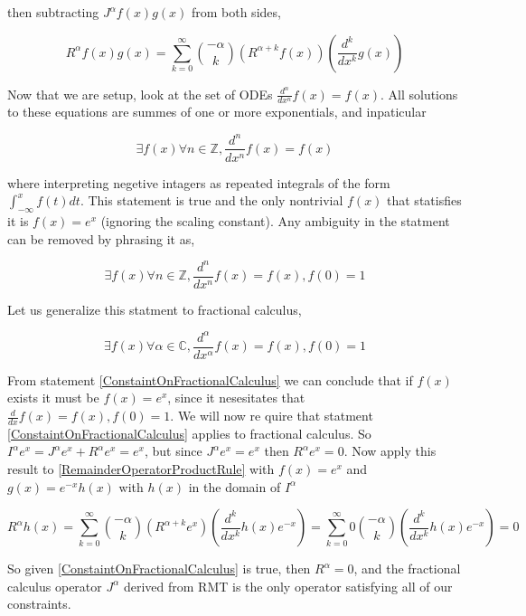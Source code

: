 \documentclass[%
 preprint,
 amsmath, amssymb, aps, pra, 10pt
]{revtex4-2}
\begin{document}
then subtracting $J^\alpha f(x)g(x)$ from both sides, 

\begin{equation}
R^\alpha f(x)g(x) = \sum_{k=0}^\infty \binom{-\alpha}{k}\left( R^{\alpha + k}f(x) \right)\left( \frac{d^k}{dx^k} g(x)\right)
\label{RemainderOperatorProductRule}
\end{equation}

Now that we are setup, look at the set of ODEs $\frac{d^n}{dx^n}f(x) = f(x)$. All solutions to these equations are summes of one or more exponentials, and inpaticular

\[\exists f(x) \forall n \in \mathbb{Z}, \frac{d^n}{dx^n}f(x) = f(x)\]

where interpreting negetive intagers as repeated integrals of the form $\int_{-\infty}^x f(t)dt$. This statement is true and the only nontrivial $f(x)$ that statisfies it is $f(x) = e^x$ (ignoring the scaling constant). Any ambiguity in the statment can be removed by phrasing it as,

\begin{equation}
\exists f(x) \forall n \in \mathbb{Z}, \frac{d^n}{dx^n}f(x) = f(x), f(0) = 1
\label{ConstaintOnCalculus}
\end{equation}

Let us generalize this statment to fractional calculus,

\begin{equation}
\exists f(x) \forall \alpha \in \mathbb{C}, \frac{d^\alpha}{dx^\alpha}f(x) = f(x), f(0) = 1
\label{ConstaintOnFractionalCalculus}
\end{equation}

From statement \eqref{ConstaintOnFractionalCalculus} we can conclude that if $f(x)$ exists it must be $f(x) = e^x$, since it nesesitates that $\frac{d}{dx}f(x) = f(x), f(0) = 1$. We will now re	quire that statment \eqref{ConstaintOnFractionalCalculus} applies to fractional calculus. So $I^\alpha e^x = J^\alpha e^x + R^\alpha e^x = e^x$, but since $J^\alpha e^x = e^x$ then $R^\alpha e^x = 0$. Now apply this result to \eqref{RemainderOperatorProductRule} with $f(x) = e^x$ and $g(x) = e^{-x}h(x)$ with $h(x)$ in the domain of $I^\alpha$

\[R^\alpha h(x) = \sum_{k=0}^\infty \binom{-\alpha}{k}\left( R^{\alpha + k}e^x \right)\left( \frac{d^k}{dx^k} h(x)e^{-x}\right) = \sum_{k=0}^\infty 0 \binom{-\alpha}{k}\left( \frac{d^k}{dx^k} h(x)e^{-x}\right) = 0\]

So given \eqref{ConstaintOnFractionalCalculus} is true, then $R^\alpha = 0$, and the fractional calculus operator $J^\alpha$ derived from RMT is the only operator satisfying all of our constraints.
\end{document}
